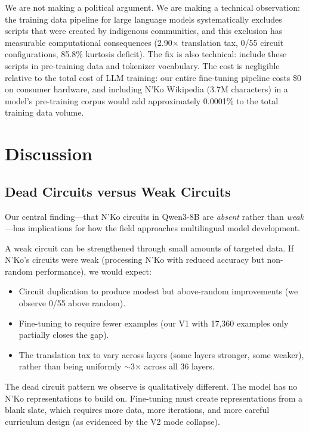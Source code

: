 \documentclass[11pt]{article}
\begin{document}
We are not making a political argument.
We are making a technical observation: the training data pipeline for large language models systematically excludes scripts that were created by indigenous communities, and this exclusion has measurable computational consequences (2.90$\times$ translation tax, 0/55 circuit configurations, 85.8\% kurtosis deficit).
The fix is also technical: include these scripts in pre-training data and tokenizer vocabulary.
The cost is negligible relative to the total cost of LLM training: our entire fine-tuning pipeline costs \$0 on consumer hardware, and including N'Ko Wikipedia (3.7M characters) in a model's pre-training corpus would add approximately 0.0001\% to the total training data volume.

\section{Discussion}

\subsection{Dead Circuits versus Weak Circuits}

Our central finding---that N'Ko circuits in Qwen3-8B are \emph{absent} rather than \emph{weak}---has implications for how the field approaches multilingual model development.

A weak circuit can be strengthened through small amounts of targeted data.
If N'Ko's circuits were weak (processing N'Ko with reduced accuracy but non-random performance), we would expect:
\begin{itemize}
\item Circuit duplication to produce modest but above-random improvements (we observe 0/55 above random).
\item Fine-tuning to require fewer examples (our V1 with 17,360 examples only partially closes the gap).
\item The translation tax to vary across layers (some layers stronger, some weaker), rather than being uniformly $\sim$3$\times$ across all 36 layers.
\end{itemize}

The dead circuit pattern we observe is qualitatively different.
The model has no N'Ko representations to build on.
Fine-tuning must create representations from a blank slate, which requires more data, more iterations, and more careful curriculum design (as evidenced by the V2 mode collapse).
\end{document}
